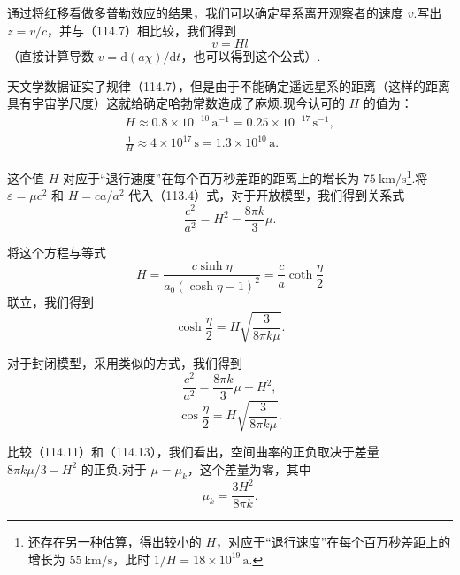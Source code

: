通过将红移看做多普勒效应的结果，我们可以确定星系离开观察者的速度 $v$.写出 $z=v/c$，并与（114.7）相比较，我们得到
\begin{equation}
  v=Hl
\end{equation}
（直接计算导数 $v=\mathrm{d}(a\chi)/\mathrm{d}t$，也可以得到这个公式）.

天文学数据证实了规律（114.7），但是由于不能确定遥远星系的距离（这样的距离具有宇宙学尺度）这就给确定哈勃常数造成了麻烦.现今认可的 $H$ 的值为：
\begin{equation}
  \begin{gathered}
    H\approx0.8\times10^{-10}\,\mathrm{a}^{-1}
    =0.25\times10^{-17}\,\mathrm{s}^{-1},\\
    \frac{1}{H}\approx4\times10^{17}\,\mathrm{s}
    =1.3\times10^{10}\,\mathrm{a}.
  \end{gathered}
\end{equation}

这个值 $H$ 对应于“退行速度”在每个百万秒差距的距离上的增长为 $75\ \mathrm{km/s}$\footnote{还存在另一种估算，得出较小的 $H$，对应于“退行速度”在每个百万秒差距上的增长为 $55\ \mathrm{km/s}$，此时 $1/H=18\times10^{19}\,\mathrm{a}$.}.将 $\varepsilon=\mu c^{2}$ 和 $H=ca/a^{2}$ 代入（113.4）式，对于开放模型，我们得到关系式
\begin{equation}
  \frac{c^{2}}{a^{2}}=H^{2}-\frac{8\pi k}{3}\mu.
\end{equation}

将这个方程与等式
\begin{equation*}
  H=\frac{c\sinh\eta}{a_{0}(\cosh\eta-1)^{2}}
  =\frac{c}{a}\coth\frac{\eta}{2}
\end{equation*}
联立，我们得到
\begin{equation}
  \cosh\frac{\eta}{2}=H\sqrt{\frac{3}{8\pi k\mu}}.
\end{equation}

对于封闭模型，采用类似的方式，我们得到
\begin{equation}
  \frac{c^{2}}{a^{2}}=\frac{8\pi k}{3}\mu-H^{2},
\end{equation}
\begin{equation}
  \cos\frac{\eta}{2}=H\sqrt{\frac{3}{8\pi k\mu}}.
\end{equation}

比较（114.11）和（114.13），我们看出，空间曲率的正负取决于差量 $8\pi k\mu/3-H^{2}$ 的正负.对于 $\mu=\mu_{k}$，这个差量为零，其中
\begin{equation}
  \mu_{k}=\frac{3H^{2}}{8\pi k}.
\end{equation}

